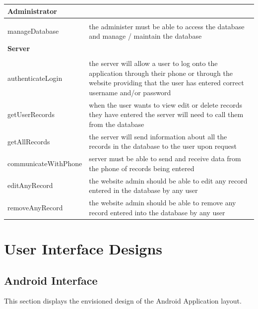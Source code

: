\documentclass[11pt, titlepage]{article}
\begin{document}
				\clearpage
				\begin{tabu} to 1\textwidth {X[l] | X[l]}
				\hline \textbf{Administrator} &  \\ \hline \\
					manageDatabase & the administer must be able to access the database and manage / maintain the database \\
				\hline \textbf{Server} &  \\ \hline \\
					authenticateLogin & the server will allow a user to log onto the application through their phone or through the website providing that the user has entered correct username and/or password \\
					getUserRecords & when the user wants to view edit or delete records they have entered the server will need to call them from the database \\
					getAllRecords & the server will send information about all the records in the database to the user upon request \\
					communicateWithPhone & server must be able to send and receive data from the phone of records being entered \\
					editAnyRecord & the website admin should be able to edit any record entered in the database by any user \\
					removeAnyRecord & the website admin should be able to remove any record entered into the database by any user \\
				\end{tabu}
		\clearpage
	\section{User Interface Designs}
		\subsection{Android Interface}
			This section displays the envisioned design of the Android Application layout.
\end{document}
